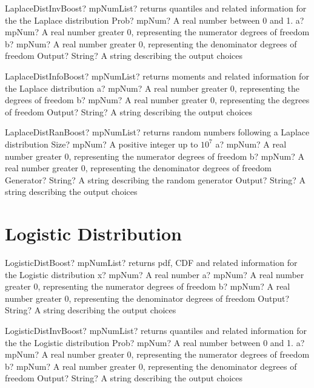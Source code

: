 \documentclass[12pt,a4paper,openany]{book}
\begin{document}
\begin{mpFunctionsExtract}
\mpFunctionFour
{LaplaceDistInvBoost? mpNumList? returns quantiles and related information for the the Laplace distribution}
{Prob? mpNum? A real number between 0 and 1.}
{a? mpNum? A real number greater 0, representing the numerator  degrees of freedom}
{b? mpNum? A real number greater 0, representing the denominator degrees of freedom}
{Output? String? A string describing the output choices}
\end{mpFunctionsExtract}

\begin{mpFunctionsExtract}
\mpFunctionThree
{LaplaceDistInfoBoost? mpNumList? returns moments and related information for the Laplace distribution}
{a? mpNum? A real number greater 0, representing the degrees of freedom}
{b? mpNum? A real number greater 0, representing the degrees of freedom}
{Output? String? A string describing the output choices}
\end{mpFunctionsExtract}

\begin{mpFunctionsExtract}
\mpFunctionFive
{LaplaceDistRanBoost? mpNumList? returns random numbers following a Laplace distribution}
{Size? mpNum? A positive integer up to $10^7$}
{a? mpNum? A real number greater 0, representing the numerator  degrees of freedom}
{b? mpNum? A real number greater 0, representing the denominator degrees of freedom}
{Generator? String? A string describing the random generator}
{Output? String? A string describing the output choices}
\end{mpFunctionsExtract}

\section{Logistic Distribution}

\begin{mpFunctionsExtract}
\mpFunctionFour
{LogisticDistBoost? mpNumList? returns pdf, CDF and related information for the Logistic distribution}
{x? mpNum? A real number}
{a? mpNum? A real number greater 0, representing the numerator  degrees of freedom}
{b? mpNum? A real number greater 0, representing the denominator degrees of freedom}
{Output? String? A string describing the output choices}
\end{mpFunctionsExtract}

\begin{mpFunctionsExtract}
\mpFunctionFour
{LogisticDistInvBoost? mpNumList? returns quantiles and related information for the the Logistic distribution}
{Prob? mpNum? A real number between 0 and 1.}
{a? mpNum? A real number greater 0, representing the numerator  degrees of freedom}
{b? mpNum? A real number greater 0, representing the denominator degrees of freedom}
{Output? String? A string describing the output choices}
\end{mpFunctionsExtract}
\end{document}
